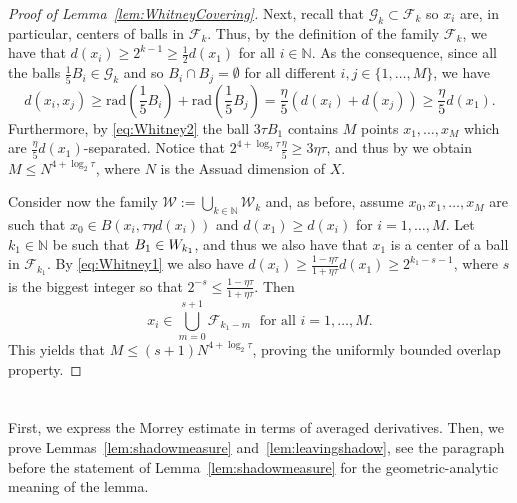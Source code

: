 \documentclass[11pt,a4paper,reqno]{amsart}
\theoremstyle{definition}
\newcommand{\N}{\mathbb{N}}
\numberwithin{komcounter}{section}
\begin{document}
\begin{appendix}
\begin{proof}[Proof of Lemma~\ref{lem:WhitneyCovering}]
Next, recall that $\mathcal G_k\subset \mathcal F_k$ so $x_i$ are, in particular, centers of balls in $\mathcal F_k$. Thus, by the definition of the family $\mathcal F_k$, we have that $d(x_i)\geq 2^{k-1}\geq \frac{1}{2}d(x_1)$ for all $i\in\N$. As the consequence, since all the balls $\frac{1}{5}B_i\in \mathcal G_k$ and so $B_i\cap B_j =\emptyset$ for all different $i,j\in\{ 1,\dots ,M\}$, we have
\begin{equation*}
	d(x_i,x_j) \geq \mathrm{rad} (\frac{1}{5}B_i)+\mathrm{rad} (\frac{1}{5}B_j) =\frac{\eta}{5}(d(x_i)+d(x_j)) \geq \frac{\eta}{5}d(x_1).
\end{equation*}
Furthermore, by \eqref{eq:Whitney2} the ball $3\tau B_1$ contains $M$ points $x_1,\dots ,x_M$ which are $\frac{\eta}{5}d(x_1)$-separated. Notice that
$2^{4+\log_2\tau}\frac{\eta}{5}\geq 3\eta\tau$, and thus by \cite[Lemma 4.1.12]{hkst} we obtain $M\leq N^{4+\log_2\tau}$, where $N$ is the Assuad dimension of $X$. 

Consider now the family $\mathcal W:=\bigcup_{k\in\N}\mathcal W_k$ and, as before, assume $x_0,x_1,\dots ,x_M$ are such that $x_0\in B(x_i,\tau\eta d(x_i))$ and $d(x_1)\geq d(x_i)$ for $i=1,\dots ,M$. Let $k_1\in\N$ be such that $B_1\in \mathcal \mathcal W_{k_1}$, and thus we also have that $x_1$ is a center of a ball in $\mathcal F_{k_1}$. By \eqref{eq:Whitney1} we also have $d(x_i)\geq\frac{1-\eta\tau}{1+\eta\tau}d(x_1)\geq 2^{k_1-s-1}$, where $s$ is the biggest integer so that $2^{-s}\leq \frac{1-\eta\tau}{1+\eta\tau}$. Then
$$
x_i\in\bigcup_{m=0}^{s+1}\mathcal F_{k_1-m}\;\mbox{ for all }i=1,\dots ,M.
$$
This yields that $M\leq (s+1)N^{4+\log_2\tau}$, proving the uniformly bounded overlap property.

\end{proof}



\section{}\label{appB}

First, we express the Morrey estimate in terms of averaged derivatives. Then, we prove Lemmas~\ref{lem:shadowmeasure} and~\ref{lem:leavingshadow}, see the paragraph before the statement of Lemma~\ref{lem:shadowmeasure} for the geometric-analytic meaning of the lemma.


\end{appendix}
\end{document}
